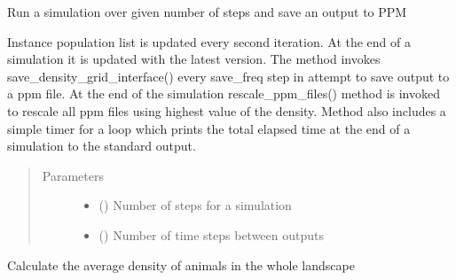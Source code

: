 \documentclass[letterpaper,10pt,english]{sphinxmanual}
\begin{document}
\begin{fulllineitems}
\begin{fulllineitems}
\begin{quote}
\begin{description}
\end{description}\end{quote}

\end{fulllineitems}


\begin{fulllineitems}
\label{\detokenize{pumha:pumha.sim.Simulation.run}}
Run a simulation over given number of steps and save an output to PPM

Instance population list is updated every second iteration. At the end
of a simulation it is updated with the latest version.
The method invokes save\_density\_grid\_interface() every save\_freq step
in attempt to save output to a ppm file.
At the end of the simulation rescale\_ppm\_files() method is invoked to
rescale all ppm files using highest value of the density.
Method also includes a simple timer for a loop which prints the
total elapsed time at the end of a simulation to the standard output.
\begin{quote}\begin{description}
\item[{Parameters}] \leavevmode\begin{itemize}
\item {} 
 () \textendash{} Number of steps for a simulation

\item {} 
 () \textendash{} Number of time steps between outputs

\end{itemize}

\end{description}\end{quote}

\end{fulllineitems}


\begin{fulllineitems}
\label{\detokenize{pumha:pumha.sim.Simulation.save_average_density}}
Calculate the average density of animals in the whole landscape


\end{fulllineitems}
\end{fulllineitems}
\end{document}
